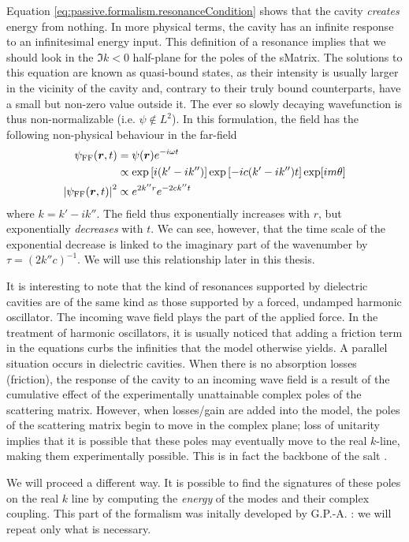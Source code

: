 Equation \eqref{eq:passive.formalism.resonanceCondition} shows that the cavity 
\textit{creates} energy from nothing. In more physical terms, the cavity
has an infinite response to an infinitesimal energy input. This definition
of a resonance implies that we should look in the $\Im{k}<0$ half-plane
for the poles of the \gls{sMatrix}. The solutions to this equation 
are known as quasi-bound states, as their intensity is usually larger
in the vicinity of the cavity and, contrary to their truly bound counterparts, 
have a small but non-zero value outside it. The ever so slowly decaying wavefunction
is thus non-normalizable (i.e. $\psi\notin L^2$). In this formulation, the field
has the following non-physical behaviour in the far-field
  \begin{align*}
   \psi_\text{FF}(\boldsymbol{r},t) 			&= \psi(\boldsymbol{r})e^{-i\omega t}	\\
						&\propto \exp\left[i(k'-ik'')\right]\exp\left[-ic(k'-ik'')t\right]\exp[im\theta]	\\
   \left|\psi_\text{FF}(\boldsymbol{r},t)\right|^2 	&\propto e^{2k''r}e^{-2ck''t} 
  \end{align*}
where $k=k'-ik''$. The field thus exponentially increases with $r$, 
but exponentially \textit{decreases} with $t$. We can see, however, 
that the time scale of the exponential decrease is linked to the
imaginary part of the wavenumber by $\tau=\left(2k''c\right)^{-1}$.
We will use this relationship later in this thesis.

It is interesting to note that the kind of resonances supported
by dielectric cavities are of the same kind as those supported
by a forced, undamped harmonic oscillator. The incoming wave field
plays the part of the applied force. In the treatment of 
harmonic oscillators, it is usually noticed that adding a friction 
term in the equations curbs the infinities that the model otherwise 
yields. A parallel situation occurs in dielectric cavities. When there
is no absorption losses (friction), the response of the cavity 
to an incoming wave field is a result of the cumulative effect 
of the experimentally unattainable complex poles of the scattering matrix. 
However, when losses/gain are added into the model, the poles of the scattering
matrix begin to move in the complex plane; loss of unitarity implies that
it is possible that these poles may eventually move to the real $k$-line, 
making them experimentally possible. This is in fact the backbone 
of the \gls{salt} \cite{GE2010a,GE2010b}.

We will proceed a different way. It is possible to find the signatures
of these poles on the real $k$ line by computing the \textit{energy}
of the modes and their complex coupling. This part of the formalism
was initally developed by G.P.-A. \cite{GAP2013a}: we will repeat
only what is necessary. 

